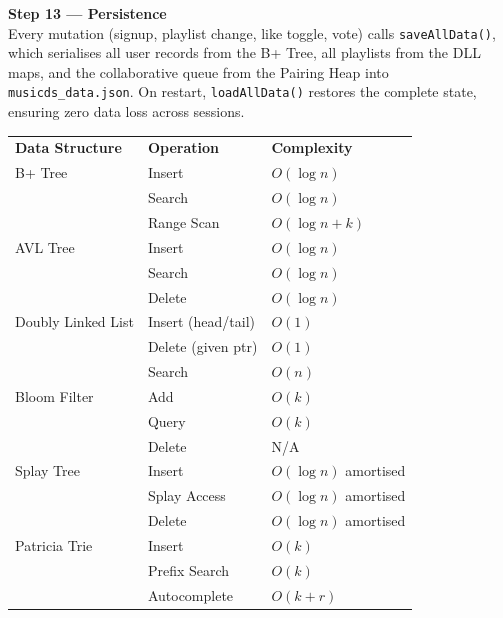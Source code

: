 \documentclass[12pt, a4paper]{article}
\begin{document}
\textbf{Step 13 --- Persistence}\\
Every mutation (signup, playlist change, like toggle, vote) calls \texttt{saveAllData()}, which serialises all user records from the B+ Tree, all playlists from the DLL maps, and the collaborative queue from the Pairing Heap into \texttt{musicds\_data.json}. On restart, \texttt{loadAllData()} restores the complete state, ensuring zero data loss across sessions.


\vspace{0.5cm}

\renewcommand{\arraystretch}{1.4}
\begin{tabular}{@{} p{4.5cm} p{4.5cm} p{4.5cm} @{}}
\textbf{Data Structure} & \textbf{Operation} & \textbf{Complexity} \\[6pt]

B+ Tree & Insert & $O(\log n)$ \\
        & Search & $O(\log n)$ \\
        & Range Scan & $O(\log n + k)$ \\[6pt]

AVL Tree & Insert & $O(\log n)$ \\
         & Search & $O(\log n)$ \\
         & Delete & $O(\log n)$ \\[6pt]

Doubly Linked List & Insert (head/tail) & $O(1)$ \\
                   & Delete (given ptr) & $O(1)$ \\
                   & Search & $O(n)$ \\[6pt]

Bloom Filter & Add & $O(k)$ \\
             & Query & $O(k)$ \\
             & Delete & N/A \\[6pt]

Splay Tree & Insert & $O(\log n)$ amortised \\
           & Splay Access & $O(\log n)$ amortised \\
           & Delete & $O(\log n)$ amortised \\[6pt]

Patricia Trie & Insert & $O(k)$ \\
              & Prefix Search & $O(k)$ \\
              & Autocomplete & $O(k + r)$ \\[6pt]


\end{tabular}
\end{document}
